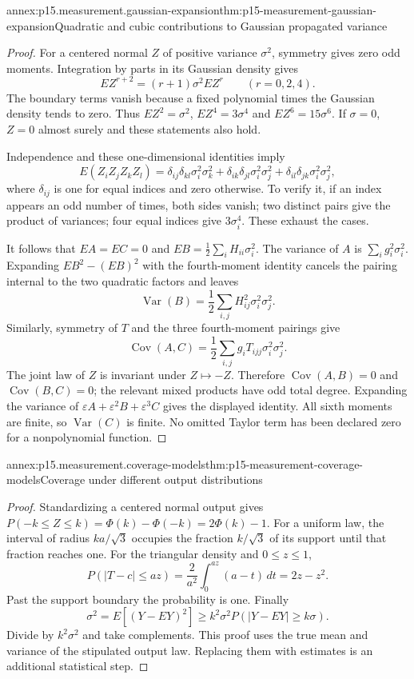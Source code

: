 \begin{annexitem}{annex:p15.measurement.gaussian-expansion}{thm:p15-measurement-gaussian-expansion}{Quadratic and cubic contributions to Gaussian propagated variance}
\begin{proof}
For a centered normal \(Z\) of positive variance \(\sigma^2\),
symmetry gives zero odd moments. Integration by parts in its Gaussian
density gives
\[
 E Z^{r+2}=(r+1)\sigma^2 E Z^r \qquad(r=0,2,4).
\]
The boundary terms vanish because a fixed polynomial times the Gaussian
density tends to zero. Thus \(EZ^2=\sigma^2\),
\(EZ^4=3\sigma^4\) and \(EZ^6=15\sigma^6\).
If \(\sigma=0\), \(Z=0\) almost surely and these statements also hold.

Independence and these one-dimensional identities imply
\[
 E(Z_iZ_jZ_kZ_l)=
 \delta_{ij}\delta_{kl}\sigma_i^2\sigma_k^2+
 \delta_{ik}\delta_{jl}\sigma_i^2\sigma_j^2+
 \delta_{il}\delta_{jk}\sigma_i^2\sigma_j^2,
\]
where \(\delta_{ij}\) is one for equal indices and zero otherwise.
To verify it, if an index appears an odd number of times, both sides
vanish; two distinct pairs give the product of variances; four equal
indices give \(3\sigma_i^4\). These exhaust the cases.

It follows that \(EA=EC=0\) and
\(EB=\frac12\sum_iH_{ii}\sigma_i^2\).
The variance of \(A\) is \(\sum_i g_i^2\sigma_i^2\).
Expanding \(EB^2-(EB)^2\) with the fourth-moment identity cancels
the pairing internal to the two quadratic factors and leaves
\[
 \operatorname{Var}(B)=\frac12\sum_{i,j}H_{ij}^2\sigma_i^2\sigma_j^2.
\]
Similarly, symmetry of \(T\) and the three fourth-moment pairings give
\[
 \operatorname{Cov}(A,C)=
 \frac12\sum_{i,j}g_iT_{ijj}\sigma_i^2\sigma_j^2.
\]
The joint law of \(Z\) is invariant under \(Z\mapsto-Z\).
Therefore \(\operatorname{Cov}(A,B)=0\) and
\(\operatorname{Cov}(B,C)=0\); the relevant mixed products have odd
total degree. Expanding the variance of
\(\varepsilon A+\varepsilon^2B+\varepsilon^3C\) gives the displayed
identity. All sixth moments are finite, so \(\operatorname{Var}(C)\)
is finite. No omitted Taylor term has been declared zero for a
nonpolynomial function.
\end{proof}
\end{annexitem}

\begin{annexitem}{annex:p15.measurement.coverage-models}{thm:p15-measurement-coverage-models}{Coverage under different output distributions}
\begin{proof}
Standardizing a centered normal output gives
\(P(-k\leq Z\leq k)=\Phi(k)-\Phi(-k)=2\Phi(k)-1\).
For a uniform law, the interval of radius \(k a/\sqrt3\) occupies the
fraction \(k/\sqrt3\) of its support until that fraction reaches one.
For the triangular density and \(0\leq z\leq1\),
\[
 P(|T-c|\leq az)=\frac2{a^2}\int_0^{az}(a-t)\,dt=2z-z^2.
\]
Past the support boundary the probability is one.
Finally
\[
 \sigma^2=E[(Y-EY)^2]
 \geq k^2\sigma^2 P(|Y-EY|\geq k\sigma).
\]
Divide by \(k^2\sigma^2\) and take complements.
This proof uses the true mean and variance of the stipulated output law.
Replacing them with estimates is an additional statistical step.
\end{proof}
\end{annexitem}

